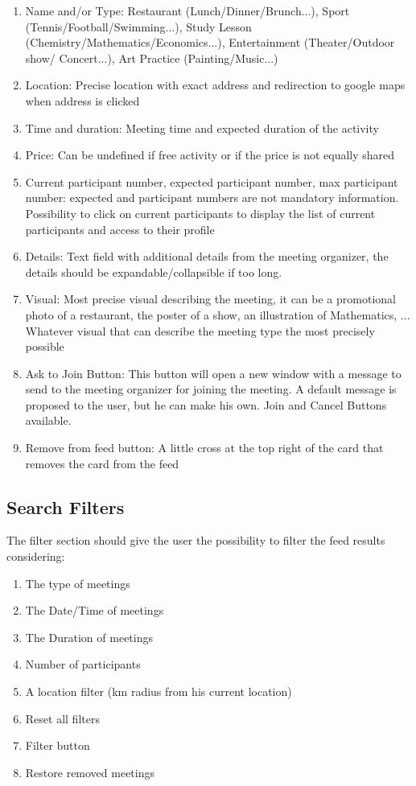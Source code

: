 \documentclass[conference]{IEEEtran}
\begin{document}
\begin{enumerate}
\item Name and/or Type: Restaurant
(Lunch/Dinner/Brunch...), Sport (Tennis/Football/Swimming...), Study Lesson (Chemistry/Mathematics/Economics...), Entertainment (Theater/Outdoor show/ Concert...), Art Practice (Painting/Music...)
\item Location: Precise location with exact address and redirection to google maps when address is clicked
\item Time and duration: Meeting time and expected duration
of the activity
\item Price: Can be undefined if free activity or if the price is
not equally shared
\item Current participant number, expected participant
number, max participant number: expected and participant numbers are not mandatory information.
Possibility to click on current participants to display the
list of current participants and access to their profile
\item Details: Text field with additional details from the meeting organizer, the details should be
expandable/collapsible if too long.
\item Visual: Most precise visual describing the meeting, it can
be a promotional photo of a restaurant, the poster of a show, an illustration of Mathematics, ... Whatever visual that can describe the meeting type the most precisely possible
\item Ask to Join Button: This button will open a new window with a message to send to the meeting organizer for joining the meeting. A default message is proposed to the user, but he can make his own. Join and Cancel Buttons available.
\item Remove from feed button: A little cross at the top right of the card that removes the card from the feed
\end{enumerate}

\subsection{Search Filters}

The filter section should give the user the possibility to filter the feed results considering:

\begin{enumerate}
\item The type of meetings
\item The Date/Time of meetings
\item The Duration of meetings
\item Number of participants
\item A location filter (km radius from his current
location)
\item Reset all filters
\item Filter button
\item Restore removed meetings
\end{enumerate}
\end{document}
